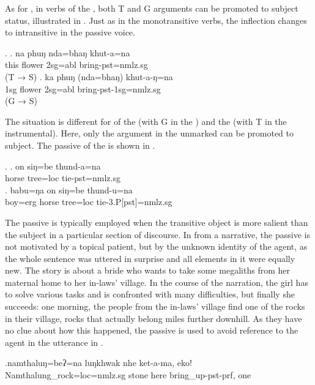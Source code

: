 As for , in verbs of the , both T and G arguments can be promoted to subject  status, illustrated in \Next. Just as in the monotransitive verbs, the inflection changes to intransitive in the passive voice. 

\ex. \ag. na phuŋ nda=bhaŋ khut-a=na\\
this  flower {\sc 2sg=abl} bring{\sc [3sg]-pst=nmlz.sg}\\
 (T → S)
\bg. ka phuŋ (nda=bhaŋ) khut-a-ŋ=na\\ 
{\sc 1sg} flower {\sc 2sg=abl} bring{\sc -pst-1sg=nmlz.sg}\\
 (G → S)
 

The situation is different for  of the  (with G in the ) and the  (with T in the instrumental). Here, only the argument in the  unmarked  can be promoted to subject. The passive of the  is shown in \Next.

\ex. \ag. on siŋ=be thund-a=na\\
horse  tree{\sc =loc} tie{\sc [3sg]-pst=nmlz.sg}\\
\bg. babu=ŋa on siŋ=be thund-u=na\\
boy{\sc =erg} horse  tree{\sc =loc}  tie{\sc -3.P[pst]=nmlz.sg}\\


The passive is typically employed when the transitive object is more salient than the subject in a particular section of discourse. In \Next from a narrative, the passive is not motivated by a topical patient, but by the unknown identity of the agent, as the whole sentence was uttered in surprise and all elements in it were equally new. The story is about a bride who wants to take some megaliths from her maternal home to her in-laws' village. In the course of the narration, the girl has to solve various tasks and is confronted with many difficulties, but finally she succeeds: one morning, the people from the in-laws' village find one of the rocks in their village, rocks that actually belong miles further downhill. As they have no clue about how this happened, the passive is used to avoid reference to the agent in the utterance in \Next. 

\exg.namthaluŋ=beʔ=na  luŋkhwak nhe  ket-a-ma, eko!\\
Namthalung\_rock{\sc =loc=nmlz.sg} stone here bring\_up{\sc [3sg]-pst-prf}, one\\


